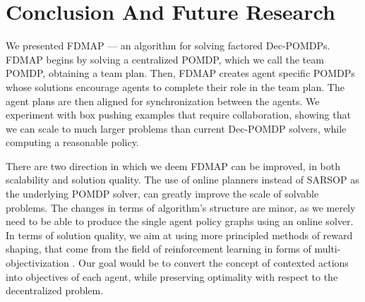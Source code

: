 \documentclass[letterpaper]{article} %
\theoremstyle{definition}
\newcommand{\commentout}[1]{}
\newcommand{\eliran}[1]{\textbf{[\color{red}ELIRAN:#1]}}
\newcommand{\ronen}[1]{\textbf{[\color{blue}RONEN:#1]}}
\begin{document}
\section{Conclusion And Future Research}
We presented FDMAP --- an algorithm for solving factored Dec-POMDPs. FDMAP begins by solving a centralized POMDP, which we call the team POMDP, obtaining a team plan. Then, FDMAP creates agent specific POMDPs whose solutions encourage agents to complete their role in the team plan. The agent plans are then aligned for synchronization between the agents. We experiment with box pushing examples that require collaboration, showing that we can scale to much larger problems than current Dec-POMDP solvers, while computing a reasonable policy.

There are two direction in which we deem FDMAP can be improved, in both scalability and solution quality.
The use of online planners instead of SARSOP as the underlying POMDP solver, can greatly improve the scale of solvable problems. The changes in terms of algorithm's structure are minor, as we merely need to be able to produce the single agent policy graphs using an online solver.
In terms of solution quality, we aim at using more principled methods of reward shaping, that come from the field of reinforcement learning in forms of multi-objectivization \cite{REWARDSHAPING}.
Our goal would be to convert the concept of contexted actions into objectives of each agent, while preserving optimality with respect to the decentralized problem.

\commentout{
There are two direction in which we deem FDMAP can be improved, in both scalability and solution quality.
The use of online planners instead of SARSOP as the POMDP solver, can greatly improve the scale of solvable problems. The changes in terms of algorithm architecture are minor, as we merely need to be able to produce the single agent policy graphs using an online solver. \ronen{In fact, it seems we could use an RL algorithm here to generate a policy for each agent, as we can simulate as many traces as we wish.
In fact, we could use the RL algorithm to solve the team POMDP. This would generate the needed traces as well. We would learn incrementally
both the team solution and the single-agent solution. Using this idea, we could probably scale up to very large problems. In fact, we can use this
approach to do MA RL. If we can do the projections. What we need is a simulator that let's us control all the agents at once.}
In terms of solution quality, we aim at using more principled methods of reward shaping, that come from the worlds of reinforcement learning in forms of multi-objectivization \cite{REWARDSHAPING}.
Our goal would be to convert the concept of contexted actions |as defined in section 3.2| into objectives of each agent, while preserving optimality with respect to the decentralized problem.
}



\end{document}
